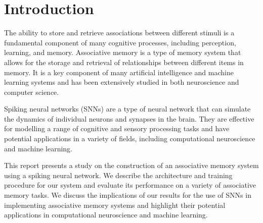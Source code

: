 \chapter{Introduction}%

The ability to store and retrieve associations between different stimuli is a
fundamental component of many cognitive processes, including perception,
learning, and memory. Associative memory is a type of memory system that allows
for the storage and retrieval of relationships between different items in
memory. It is a key component of many artificial intelligence and machine
learning systems and has been extensively studied in both neuroscience and
computer science.

Spiking neural networks (SNNs) are a type of neural network that can simulate
the dynamics of individual neurons and synapses in the brain. They are effective for modelling a range of cognitive and sensory processing
tasks and have potential applications in a variety of fields, including
computational neuroscience and machine learning.

This report presents a study on the construction of an associative memory
system using a spiking neural network. We describe the architecture and
training procedure for our system and evaluate its performance on a variety of
associative memory tasks. We discuss the implications of our results for the
use of SNNs in implementing associative memory systems and highlight their
potential applications in computational neuroscience and machine learning.


\thispagestyle{plain}